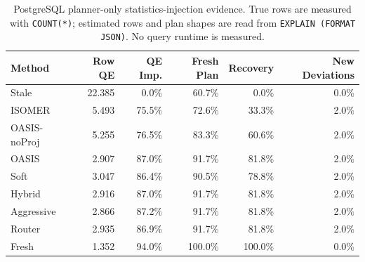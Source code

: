 \begin{table}[t]
  \centering
  \small
  \caption{PostgreSQL planner-only statistics-injection evidence. True rows are measured with \texttt{COUNT(*)}; estimated rows and plan shapes are read from \texttt{EXPLAIN (FORMAT JSON)}. No query runtime is measured.}
  \label{tab:postgres_planner_stats_injection}
  \setlength{\tabcolsep}{4pt}
  \begin{tabular}{lrrrrr}
    \toprule
    Method & Row QE & QE Imp. & Fresh Plan & Recovery & New Deviations \\
    \midrule
    Stale & 22.385 & 0.0\% & 60.7\% & 0.0\% & 0.0\% \\
    ISOMER & 5.493 & 75.5\% & 72.6\% & 33.3\% & 2.0\% \\
    OASIS-noProj & 5.255 & 76.5\% & 83.3\% & 60.6\% & 2.0\% \\
    OASIS & 2.907 & 87.0\% & 91.7\% & 81.8\% & 2.0\% \\
    Soft & 3.047 & 86.4\% & 90.5\% & 78.8\% & 2.0\% \\
    Hybrid & 2.916 & 87.0\% & 91.7\% & 81.8\% & 2.0\% \\
    Aggressive & 2.866 & 87.2\% & 91.7\% & 81.8\% & 2.0\% \\
    Router & 2.935 & 86.9\% & 91.7\% & 81.8\% & 2.0\% \\
    Fresh & 1.352 & 94.0\% & 100.0\% & 100.0\% & 0.0\% \\
    \bottomrule
  \end{tabular}
\end{table}
